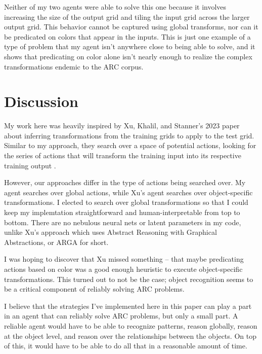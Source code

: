 \documentclass[letterpaper]{article} %
\begin{document}
Neither of my two agents were able to solve this one because it involves increasing the size of the output grid and tiling the input grid across the larger output grid. This behavior cannot be captured using global transforms, nor can it be predicated on colors that appear in the inputs. This is just one example of a type of problem that my agent isn't anywhere close to being able to solve, and it shows that predicating on color alone isn't nearly enough to realize the complex transformations endemic to the ARC corpus.

\section{Discussion}
My work here was heavily inspired by Xu, Khalil, and Stanner's 2023 paper about inferring transformations from the training grids to apply to the test grid. Similar to my approach, they search over a space of potential actions, looking for the series of actions that will transform the training input into its respective training output \cite{Xu_Khalil_Sanner_2023}.

\bigskip

However, our approaches differ in the type of actions being searched over. My agent searches over global actions, while Xu's agent searches over object-specific transformations. I elected to search over global transformations so that I could keep my implemtation straightforward and human-interpretable from top to bottom. There are no nebulous neural nets or latent parameters in my code, unlike Xu's approach which uses Abstract Reasoning with Graphical Abstractions, or ARGA for short.

\bigskip

I was hoping to discover that Xu missed something -- that maybe predicating actions based on color was a good enough heuristic to execute object-specific transformations. This turned out to not be the case; object recognition seems to be a critical component of reliably solving ARC problems.

\bigskip

I believe that the strategies I've implemented here in this paper can play a part in an agent that can reliably solve ARC problems, but only a small part. A reliable agent would have to be able to recognize patterns, reason globally, reason at the object level, and reason over the relationships between the objects. On top of this, it would have to be able to do all that in a reasonable amount of time.




\end{document}
